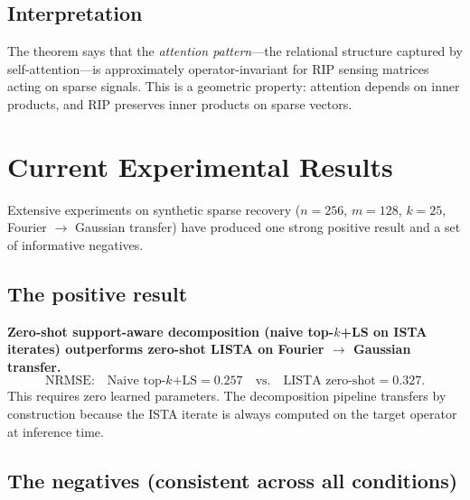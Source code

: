 \documentclass[11pt]{article}
\begin{document}
\subsection{Interpretation}

The theorem says that the \emph{attention pattern}---the relational
structure captured by self-attention---is approximately
operator-invariant for RIP sensing matrices acting on sparse signals.
This is a geometric property: attention depends on inner products,
and RIP preserves inner products on sparse vectors.

\section{Current Experimental Results}
\label{sec:results}

Extensive experiments on synthetic sparse recovery
($n = 256$, $m = 128$, $k = 25$, Fourier $\to$ Gaussian transfer)
have produced one strong positive result and a set of informative
negatives.

\subsection{The positive result}

\begin{mdframed}
\textbf{Zero-shot support-aware decomposition (naive top-$k$+LS on ISTA
iterates) outperforms zero-shot LISTA on Fourier $\to$ Gaussian transfer.}
\begin{equation}
\text{NRMSE:}\quad
\text{Naive top-}k\text{+LS} = 0.257
\quad\text{vs.}\quad
\text{LISTA zero-shot} = 0.327.
\end{equation}
This requires zero learned parameters. The decomposition pipeline
transfers by construction because the ISTA iterate is always computed
on the target operator at inference time.
\end{mdframed}

\subsection{The negatives (consistent across all conditions)}
\end{document}
